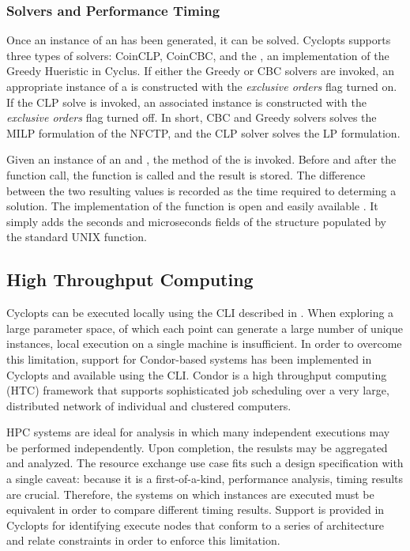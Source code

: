\subsubsection{Solvers and Performance Timing}

Once an instance of an  has been generated, it can be
solved. Cyclopts supports three types of solvers: CoinCLP, CoinCBC, and the
, an implementation of the Greedy Hueristic in Cyclus. If
either the Greedy or CBC solvers are invoked, an appropriate instance of a
 is constructed with the \textit{exclusive orders} flag
turned on. If the CLP solve is invoked, an associated 
instance is constructed with the \textit{exclusive orders} flag turned off. In
short, CBC and Greedy solvers solves the MILP formulation of the NFCTP, and the
CLP solver solves the LP formulation.

Given an instance of an  and , the
 method of the  is invoked. Before and after
the  function call, the  function is called and
the result is stored. The difference between the two resulting values is
recorded as the time required to determing a solution. The implementation of the
 function is open and easily available \cite{}. It simply adds
the seconds and microseconds fields of the  structure populated
by the standard UNIX  function.

\subsection{High Throughput Computing}\label{method:tools:htc}

Cyclopts can be executed locally using the  CLI described
in \label{method:tools:cli}. When exploring a large parameter space, of which
each point can generate a large number of unique instances, local execution on a
single machine is insufficient. In order to overcome this limitation, support
for Condor-based systems has been implemented in Cyclopts and available using
the  CLI. Condor \cite{condor-practice} is a high
throughput computing (HTC) framework that supports sophisticated job scheduling
over a very large, distributed network of individual and clustered computers.

HPC systems are ideal for analysis in which many independent executions may be
performed independently. Upon completion, the resulsts may be aggregated and
analyzed. The resource exchange use case fits such a design specification with a
single caveat: because it is a first-of-a-kind, performance analysis, timing
results are crucial. Therefore, the systems on which instances are executed must
be equivalent in order to compare different timing results. Support is provided
in Cyclopts for identifying execute nodes that conform to a series of
architecture and relate constraints in order to enforce this limitation.

